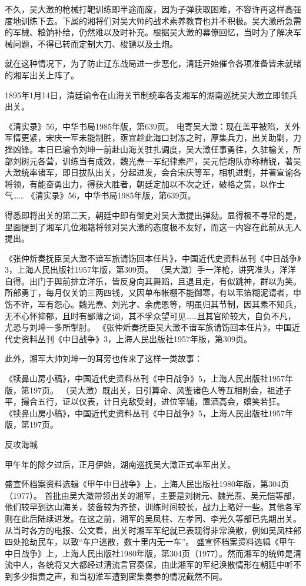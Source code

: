 \documentclass[12pt,UTF8]{ctexbook}
\begin{document}
不久，吴大澂的枪械打靶训练即半途而废，因为子弹获取困难，不容许再这样高强度地训练下去。下属的湘将们对吴大帅的战术素养教育也并不积极。吴大澂所急需的军械、粮饷补给，仍然难以及时补充。根据吴大澂的幕僚回忆，当时为了解决军械问题，不得已转而定制大刀、梭镖以及土炮。

就在这种情况下，为了防止辽东战局进一步恶化，清廷开始催令各项准备皆未就绪的湘军出关上阵了。

1895年1月14日，清廷谕令在山海关节制统率各支湘军的湖南巡抚吴大澂立即领兵出关。

《清实录》56，中华书局1985年版，第639页。
电寄吴大澂：现在盖平被陷，关外军情更紧，宋庆一军未能制胜，亟宜趁此海口封冻之时，厚集兵力，出关助剿，力挫凶锋。本日已谕令刘坤一前赴山海关驻扎调度，吴大澂任事勇往，久驻榆关，所部刘树元各营，训练当有成效，魏光焘一军纪律素严，吴元恺炮队亦称精锐，著吴大澂统率诸军，即日拔队出关，分起进发，会合宋庆等军，相机进剿，并著宣谕各将领，有能奋勇出力，得获大胜者，朝廷定加以不次之迁，破格之赏，以作士气…… 《清实录》56，中华书局1985年版，第639页。

得悉即将出关的第二天，朝廷中即有御史对吴大澂提出弹劾。显得极不寻常的是，里面提到了湘军几位湘籍将领对吴大澂的态度极不友好，而这一内容在此前从无人提出。

《张仲炘奏抚臣吴大澂不谙军旅请饬回本任片》，中国近代史资料丛刊《中日战争》3，上海人民出版社1957年版，第309页。
（吴大澂）手一洋枪，讲究准头，洋洋自得。出门于舆前排立洋乐，皆反身向其舞蹈，且退且走，有似跳神，群以为笑。所部勇丁，每月仅关饷三两四钱，又因单布帐棚不能御寒，有以苇箔糊泥请者，申饬不许，军有怨心。魏光焘、刘光才、余虎恩等，明虽归其节制，因其素不知兵，无不心怀抑郁，且时有鄙薄之词，其不孚众望可见……且其官阶较大，自负不凡，尤恐与刘坤一多所掣肘。 《张仲炘奏抚臣吴大澂不谙军旅请饬回本任片》，中国近代史资料丛刊《中日战争》3，上海人民出版社1957年版，第309页。

此外，湘军大帅刘坤一的耳旁也传来了这样一类故事：

《犊鼻山房小稿》，中国近代史资料丛刊《中日战争》5，上海人民出版社1957年版，第197页。
（吴大澂）既出关，日引算命、风鉴诸色人等互相附会，祖述子平，撮合五行，证以仪表，计日克敌受封，进位宰辅，置酒高会，嬉笑若狂。 《犊鼻山房小稿》，中国近代史资料丛刊《中日战争》5，上海人民出版社1957年版，第197页。

反攻海城

甲午年的除夕过后，正月伊始，湖南巡抚吴大澂正式率军出关。

盛宣怀档案资料选辑《甲午中日战争》上，上海人民出版社1980年版，第304页（1977）。
首批由吴大澂带领出关的湘军，主要是刘树元、魏光焘、吴元恺等部，他们较早到达山海关，装备较为齐整，训练时间较长，战力上略好一些。其他各军则在此后陆续进发。在这之前，湘军的吴凤柱、左孝同、李光久等部已先期出关。从当时各方的电报、公文看，出关时湘军军纪就已表现得非常涣散，例如吴凤柱部四处抢劫民车，以致“车户逃散，数十里内无一车”。 盛宣怀档案资料选辑《甲午中日战争》上，上海人民出版社1980年版，第304页（1977）。然而湘军的统帅是清流中人，各统将又大都经过清流言官奏保，由此湘军的军纪涣散情形在朝廷中听不到多少指责之声，和当初淮军遭到密集奏参的情况截然不同。
\end{document}
